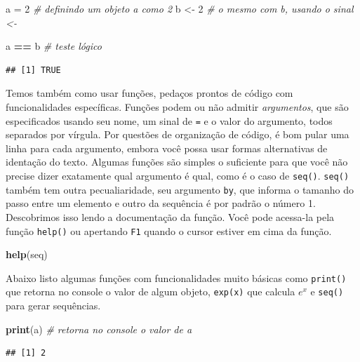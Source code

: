 \documentclass[
]{article}
\newenvironment{Shaded}{\begin{snugshade}}{\end{snugshade}}
\newcommand{\CommentTok}[1]{\textcolor[rgb]{0.56,0.35,0.01}{\textit{#1}}}
\newcommand{\DecValTok}[1]{\textcolor[rgb]{0.00,0.00,0.81}{#1}}
\newcommand{\KeywordTok}[1]{\textcolor[rgb]{0.13,0.29,0.53}{\textbf{#1}}}
\newcommand{\NormalTok}[1]{#1}
\newcommand{\OperatorTok}[1]{\textcolor[rgb]{0.81,0.36,0.00}{\textbf{#1}}}
\newcommand{\StringTok}[1]{\textcolor[rgb]{0.31,0.60,0.02}{#1}}
\begin{document}
\begin{Shaded}
\begin{Highlighting}[]
\NormalTok{a =}\StringTok{ }\DecValTok{2} \CommentTok{# definindo um objeto a como 2}
\NormalTok{b <-}\StringTok{ }\DecValTok{2} \CommentTok{# o mesmo com b, usando o sinal <-}

\NormalTok{a }\OperatorTok{==}\StringTok{ }\NormalTok{b }\CommentTok{# teste lógico}
\end{Highlighting}
\end{Shaded}

\begin{verbatim}
## [1] TRUE
\end{verbatim}

Temos também como usar funções, pedaços prontos de código com
funcionalidades específicas. Funções podem ou não admitir
\emph{argumentos}, que são especificados usando seu nome, um sinal de
\texttt{=} e o valor do argumento, todos separados por vírgula. Por
questões de organização de código, é bom pular uma linha para cada
argumento, embora você possa usar formas alternativas de identação do
texto. Algumas funções são simples o suficiente para que você não
precise dizer exatamente qual argumento é qual, como é o caso de
\texttt{seq()}. \texttt{seq()} também tem outra pecualiaridade, seu
argumento \texttt{by}, que informa o tamanho do passo entre um elemento
e outro da sequência é por padrão o número 1. Descobrimos isso lendo a
documentação da função. Você pode acessa-la pela função \texttt{help()}
ou apertando \texttt{F1} quando o cursor estiver em cima da função.

\begin{Shaded}
\begin{Highlighting}[]
\KeywordTok{help}\NormalTok{(seq)}
\end{Highlighting}
\end{Shaded}

Abaixo listo algumas funções com funcionalidades muito básicas como
\texttt{print()} que retorna no console o valor de algum objeto,
\texttt{exp(x)} que calcula \(e^x\) e \texttt{seq()} para gerar
sequências.

\begin{Shaded}
\begin{Highlighting}[]
\KeywordTok{print}\NormalTok{(a) }\CommentTok{# retorna no console o valor de a}
\end{Highlighting}
\end{Shaded}

\begin{verbatim}
## [1] 2
\end{verbatim}
\end{document}
